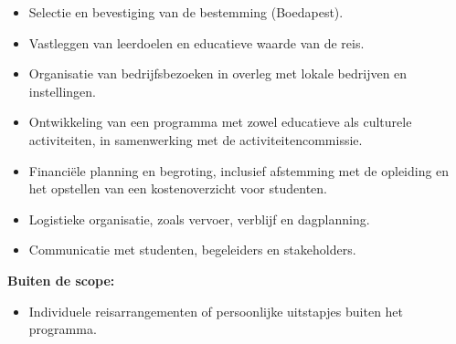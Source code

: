 \begin{itemize}
	\item Selectie en bevestiging van de bestemming (Boedapest).
	\item Vastleggen van leerdoelen en educatieve waarde van de reis.
	\item Organisatie van bedrijfsbezoeken in overleg met lokale bedrijven en instellingen.
	\item Ontwikkeling van een programma met zowel educatieve als culturele activiteiten, in samenwerking met de activiteitencommissie.
	\item Financiële planning en begroting, inclusief afstemming met de opleiding en het opstellen van een kostenoverzicht voor studenten.
	\item Logistieke organisatie, zoals vervoer, verblijf en dagplanning.
	\item Communicatie met studenten, begeleiders en stakeholders.
\end{itemize}

\textbf{Buiten de scope:}

\begin{itemize}
	\item Individuele reisarrangementen of persoonlijke uitstapjes buiten het programma.
\end{itemize}